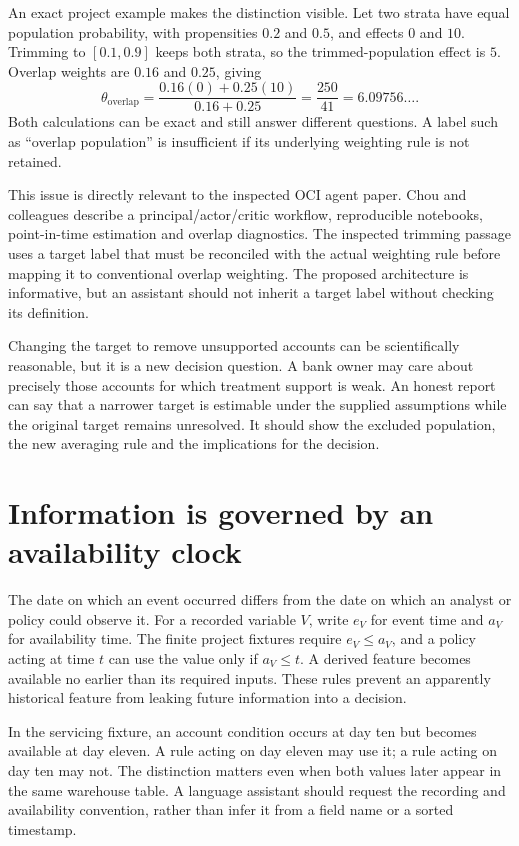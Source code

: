 An exact project example makes the distinction visible. Let two strata have
equal population probability, with propensities \(0.2\) and \(0.5\), and
effects \(0\) and \(10\). Trimming to \([0.1,0.9]\) keeps both strata, so
the trimmed-population effect is \(5\). Overlap weights are \(0.16\) and
\(0.25\), giving
\[
 \theta_{\mathrm{overlap}}=
 \frac{0.16(0)+0.25(10)}{0.16+0.25}=\frac{250}{41}
 =6.09756\ldots.
\]
Both calculations can be exact and still answer different questions. A label
such as ``overlap population'' is insufficient if its underlying weighting
rule is not retained.

This issue is directly relevant to the inspected OCI agent paper. Chou and
colleagues describe a principal/actor/critic workflow, reproducible notebooks,
point-in-time estimation and overlap diagnostics. The inspected trimming
passage uses a target label that must be reconciled with the actual weighting
rule before mapping it to conventional overlap weighting. The proposed
architecture is informative, but an assistant should not inherit a target
label without checking its definition.\cite{v12_la_2607_22443}

Changing the target to remove unsupported accounts can be scientifically
reasonable, but it is a new decision question. A bank owner may care about
precisely those accounts for which treatment support is weak. An honest report
can say that a narrower target is estimable under the supplied assumptions
while the original target remains unresolved. It should show the excluded
population, the new averaging rule and the implications for the decision.

\section{Information is governed by an availability clock}

The date on which an event occurred differs from the date on which an analyst
or policy could observe it. For a recorded variable \(V\), write \(e_V\) for
event time and \(a_V\) for availability time. The finite project fixtures
require \(e_V\leq a_V\), and a policy acting at time \(t\) can use the value
only if \(a_V\leq t\). A derived feature becomes available no earlier than
its required inputs. These rules prevent an apparently historical feature
from leaking future information into a decision.

In the servicing fixture, an account condition occurs at day ten but becomes
available at day eleven. A rule acting on day eleven may use it; a rule acting
on day ten may not. The distinction matters even when both values later appear
in the same warehouse table. A language assistant should request the recording
and availability convention, rather than infer it from a field name or a
sorted timestamp.

